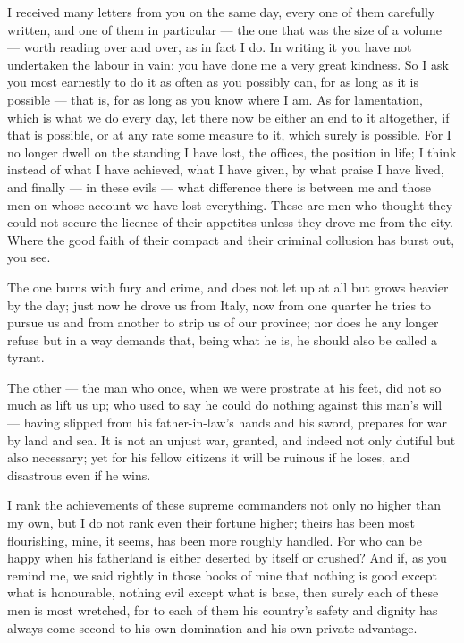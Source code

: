 

 I received many letters from you on the same day, every one of them carefully written, and one of them in particular --- the one that was the size of a volume --- worth reading over and over, as in fact I do. In writing it you have not undertaken the labour in vain; you have done me a very great kindness. So I ask you most earnestly to do it as often as you possibly can, for as long as it is possible --- that is, for as long as you know where I am. As for lamentation, which is what we do every day, let there now be either an end to it altogether, if that is possible, or at any rate some measure to it, which surely is possible. For I no longer dwell on the standing I have lost, the offices, the position in life; I think instead of what I have achieved, what I have given, by what praise I have lived, and finally --- in these evils --- what difference there is between me and those men on whose account we have lost everything. These are men who thought they could not secure the licence of their appetites unless they drove me from the city. Where the good faith of their compact and their criminal collusion has burst out, you see.

 The one burns with fury and crime, and does not let up at all but grows heavier by the day; just now he drove us from Italy, now from one quarter he tries to pursue us and from another to strip us of our province; nor does he any longer refuse but in a way demands that, being what he is, he should also be called a tyrant.

 The other --- the man who once, when we were prostrate at his feet, did not so much as lift us up; who used to say he could do nothing against this man's will --- having slipped from his father-in-law's hands and his sword, prepares for war by land and sea. It is not an unjust war, granted, and indeed not only dutiful but also necessary; yet for his fellow citizens it will be ruinous if he loses, and disastrous even if he wins.

 I rank the achievements of these supreme commanders not only no higher than my own, but I do not rank even their fortune higher; theirs has been most flourishing, mine, it seems, has been more roughly handled. For who can be happy when his fatherland is either deserted by itself or crushed? And if, as you remind me, we said rightly in those books of mine that nothing is good except what is honourable, nothing evil except what is base, then surely each of these men is most wretched, for to each of them his country's safety and dignity has always come second to his own domination and his own private advantage.


